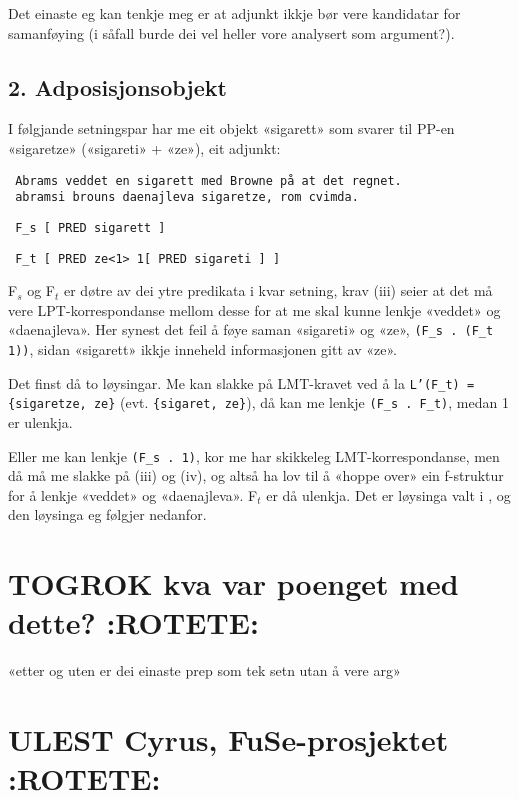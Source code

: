 \documentclass[11pt,a4paper,oneside,draft]{book}
\begin{document}
Det einaste eg kan
tenkje meg er at adjunkt ikkje bør vere kandidatar for samanføying (i
såfall burde dei vel heller vore analysert som argument?).

\subsection{2. Adposisjonsobjekt}
\label{sec-3.13.2}


I følgjande setningspar har me eit objekt «sigarett» som svarer til
PP-en «sigaretze» («sigareti» + «ze»), eit adjunkt:

\begin{verbatim}
 Abrams veddet en sigarett med Browne på at det regnet.
 abramsi brouns daenajleva sigaretze, rom cvimda.
\end{verbatim}


\begin{verbatim}
 F_s [ PRED sigarett ]
\end{verbatim}


\begin{verbatim}
 F_t [ PRED ze<1> 1[ PRED sigareti ] ]
\end{verbatim}


F$_s$ og F$_t$ er døtre av dei ytre predikata i kvar setning, krav (iii)
seier at det må vere LPT-korrespondanse mellom desse for at me skal
kunne lenkje «veddet» og «daenajleva».  Her synest det feil å føye
saman «sigareti» og «ze», \texttt{(F\_s . (F\_t 1))}, sidan «sigarett» ikkje
inneheld informasjonen gitt av «ze».

Det finst då to løysingar. Me kan slakke på LMT-kravet ved å la
\texttt{L'(F\_t) = \{sigaretze, ze\}} (evt. \texttt{\{sigaret, ze\}}), då kan me lenkje
\texttt{(F\_s . F\_t)}, medan 1 er ulenkja.

Eller me kan lenkje \texttt{(F\_s . 1)}, kor me har skikkeleg
LMT-korrespondanse, men då må me slakke på (iii) og (iv), og altså ha
lov til å «hoppe over» ein f-struktur for å lenkje «veddet» og
«daenajleva». F$_t$ er då ulenkja. Det er løysinga valt i
\citet[s.~75,~fotnote~3]{dyvik2009lmp}, og den løysinga eg følgjer
nedanfor.

\section{\textbf{TOGROK} kva var poenget med dette? \textbf{:ROTETE:}}
\label{sec-3.14}

«etter og uten er dei einaste prep som tek setn utan å vere arg»
\section{\textbf{ULEST} Cyrus, FuSe-prosjektet \textbf{:ROTETE:}}
\label{sec-3.15}
\end{document}
